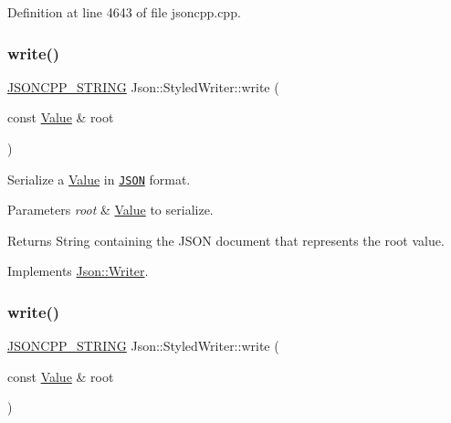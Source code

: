 Definition at line 4643 of file jsoncpp.\+cpp.

\hypertarget{class_json_1_1_styled_writer_a5efab19b9746da9920c29cdae3a6b404}{}\label{class_json_1_1_styled_writer_a5efab19b9746da9920c29cdae3a6b404} 
\subsubsection{\texorpdfstring{write()}{write()}\hspace{0.1cm}{\footnotesize\ttfamily [1/2]}}
{\footnotesize\ttfamily \hyperlink{config_8h_a1e723f95759de062585bc4a8fd3fa4be}{J\+S\+O\+N\+C\+P\+P\+\_\+\+S\+T\+R\+I\+NG} Json\+::\+Styled\+Writer\+::write (\begin{DoxyParamCaption}\item[{const \hyperlink{class_json_1_1_value}{Value} \&}]{root }\end{DoxyParamCaption})\hspace{0.3cm}{\ttfamily [virtual]}}



Serialize a \hyperlink{class_json_1_1_value}{Value} in \href{http://www.json.org}{\tt J\+S\+ON} format. 


\begin{DoxyParams}{Parameters}
{\em root} & \hyperlink{class_json_1_1_value}{Value} to serialize. \\
\hline
\end{DoxyParams}
\begin{DoxyReturn}{Returns}
String containing the J\+S\+ON document that represents the root value. 
\end{DoxyReturn}


Implements \hyperlink{class_json_1_1_writer_a61c55882b82c7651d0b9b683c6d3f371}{Json\+::\+Writer}.

\hypertarget{class_json_1_1_styled_writer_a5efab19b9746da9920c29cdae3a6b404}{}\label{class_json_1_1_styled_writer_a5efab19b9746da9920c29cdae3a6b404} 
\subsubsection{\texorpdfstring{write()}{write()}\hspace{0.1cm}{\footnotesize\ttfamily [2/2]}}
{\footnotesize\ttfamily \hyperlink{config_8h_a1e723f95759de062585bc4a8fd3fa4be}{J\+S\+O\+N\+C\+P\+P\+\_\+\+S\+T\+R\+I\+NG} Json\+::\+Styled\+Writer\+::write (\begin{DoxyParamCaption}\item[{const \hyperlink{class_json_1_1_value}{Value} \&}]{root }\end{DoxyParamCaption})\hspace{0.3cm}{\ttfamily [virtual]}}



